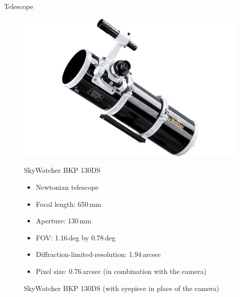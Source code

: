 \documentclass[11pt, aspectratio=169]{beamer}
\begin{document}
\begin{frame}{Telescope}
    \begin{figure}[!htb]
        \centering
        \begin{minipage}{.5\textwidth}
            \centering
            \includegraphics[width=\linewidth]{figures/images/SkyWatcher_BKP130DS.jpg}
            \caption*{SkyWatcher BKP 130DS (with eyepiece in place of the camera)}
        \end{minipage}%
        \begin{minipage}{0.5\textwidth}
            SkyWatcher BKP 130DS
            \begin{itemize}%
                \item Newtonian telescope
                \item Focal length: 650\,mm
                \item Aperture: 130\,mm
                \item FOV: 1.16\,deg by 0.78\,deg
                \item Diffraction-limited-resolution: 1.94\,arcsec
                \item Pixel size: 0.76\,arcsec (in \newline combination with the camera)
            \end{itemize}
        \end{minipage}
    \end{figure}
\end{frame}
\end{document}
